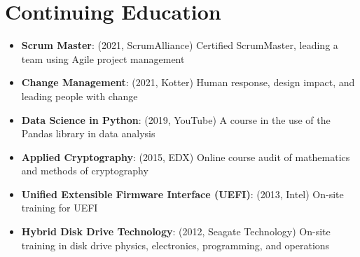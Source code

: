 \documentclass[letter,20pt]{article}
\newcommand{\resumeItem}[2]{
  \item\small{
    \textbf{#1}{: #2 \vspace{-2pt}}
  }
}
\newcommand{\resumeSubItem}[2]{\resumeItem{#1}{#2}\vspace{-3pt}}
\newcommand{\resumeSubHeadingListStart}{\begin{itemize}[leftmargin=*]}
\newcommand{\resumeSubHeadingListEnd}{\end{itemize}}
\begin{document}
\section{Continuing Education}
\resumeSubHeadingListStart
\resumeSubItem{Scrum Master}{(2021, ScrumAlliance) Certified ScrumMaster, leading a team using Agile project management}
\resumeSubItem{Change Management}{(2021, Kotter) Human response, design impact, and leading people with change}
\vspace{2pt}
\resumeSubItem{Data Science in Python}{(2019, YouTube) A course in the use of the Pandas library in data analysis}
\vspace{2pt}
\resumeSubItem{Applied Cryptography}{(2015, EDX) Online course audit of mathematics and methods of cryptography}
\vspace{2pt}
\resumeSubItem{Unified Extensible Firmware Interface (UEFI)}{(2013, Intel) On-site training for UEFI}
\vspace{2pt}
\resumeSubItem{Hybrid Disk Drive Technology}{(2012, Seagate Technology) On-site training in disk drive physics, electronics, programming, and operations}
\resumeSubHeadingListEnd

\vspace{-5pt}
\end{document}
